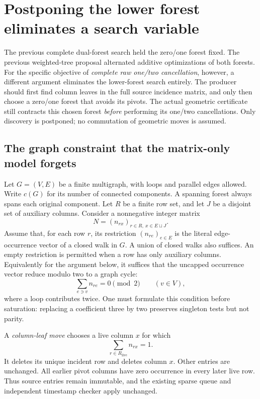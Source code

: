\section{Postponing the lower forest eliminates a search variable}
\label{sec:deferred-primal-forest}

The previous complete dual-forest search held the zero/one forest fixed.
The previous weighted-tree proposal alternated additive optimizations of
both forests.  For the specific objective of \emph{complete raw one/two
cancellation}, however, a different argument eliminates the lower-forest
search entirely.  The producer should first find column leaves in the full
source incidence matrix, and only then choose a zero/one forest that avoids
its pivots.  The actual geometric certificate still contracts this chosen
forest \emph{before} performing its one/two cancellations.  Only discovery
is postponed; no commutation of geometric moves is assumed.

\subsection{The graph constraint that the matrix-only model forgets}

Let $G=(V,E)$ be a finite multigraph, with loops and parallel edges allowed.
Write $c(G)$ for its number of connected components.  A spanning forest
always spans each original component.  Let $R$ be a finite row set, and let
$J$ be a disjoint set of auxiliary columns.  Consider a nonnegative integer
matrix
\[
 N=(n_{rx})_{r\in R,\ x\in E\sqcup J}.
\]
Assume that, for each row $r$, its restriction $(n_{re})_{e\in E}$ is the
literal edge-occurrence vector of a closed walk in $G$.  A union of closed
walks also suffices.  An empty restriction is permitted when a row has only
auxiliary columns.  Equivalently for the argument below, it suffices that
the uncapped occurrence vector reduce modulo two to a graph cycle:
\[
 \sum_{e\ni v} n_{re}=0\pmod 2 \qquad(v\in V),
\]
where a loop contributes twice.  One must formulate this condition before
saturation: replacing a coefficient three by two preserves singleton tests
but not parity.

A \emph{column-leaf move} chooses a live column $x$ for which
\[
 \sum_{r\in R_{\mathrm{live}}}n_{rx}=1.
\]
It deletes its unique incident row and deletes column $x$.  Other entries
are unchanged.  All earlier pivot columns have zero occurrence in every
later live row.  Thus source entries remain immutable, and the existing
sparse queue and independent timestamp checker apply unchanged.

